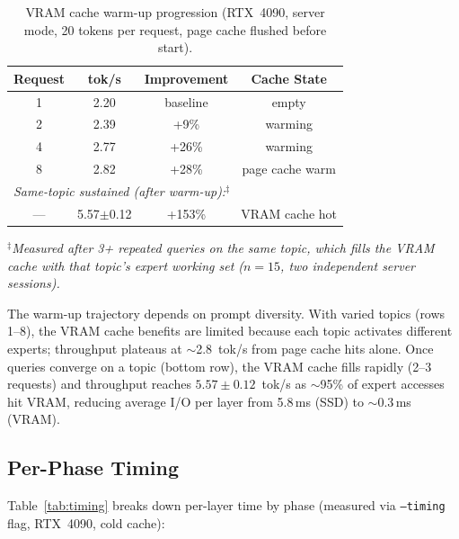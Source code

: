\documentclass[11pt]{article}
\begin{document}
\begin{table}[h]
\centering
\small
\caption{VRAM cache warm-up progression (RTX~4090, server mode, 20 tokens per request, page cache flushed before start).}
\label{tab:warmup}
\begin{tabular}{cccc}
\toprule
\textbf{Request} & \textbf{tok/s} & \textbf{Improvement} & \textbf{Cache State} \\
\midrule
1 & 2.20 & baseline & empty \\
2 & 2.39 & +9\% & warming \\
4 & 2.77 & +26\% & warming \\
8 & 2.82 & +28\% & page cache warm \\
\midrule
\multicolumn{4}{l}{\emph{Same-topic sustained (after warm-up):$^\ddagger$}} \\
--- & 5.57$\pm$0.12 & +153\% & VRAM cache hot \\
\bottomrule
\end{tabular}
\end{table}

$^\ddagger$\textit{Measured after 3+ repeated queries on the same topic, which fills the VRAM cache with that topic's expert working set ($n=15$, two independent server sessions).}

The warm-up trajectory depends on prompt diversity. With varied topics (rows 1--8), the VRAM cache benefits are limited because each topic activates different experts; throughput plateaus at $\sim$2.8~tok/s from page cache hits alone. Once queries converge on a topic (bottom row), the VRAM cache fills rapidly (2--3 requests) and throughput reaches $5.57 \pm 0.12$~tok/s as $\sim$95\% of expert accesses hit VRAM, reducing average I/O per layer from 5.8\,ms (SSD) to $\sim$0.3\,ms (VRAM).

\subsection{Per-Phase Timing}

Table~\ref{tab:timing} breaks down per-layer time by phase (measured via \texttt{--timing} flag, RTX~4090, cold cache):
\end{document}
